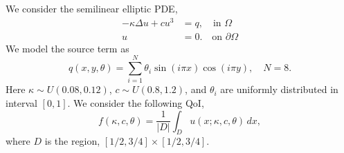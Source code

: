 We consider the semilinear elliptic PDE,
\begin{equation}\label{equ:semilinear}
\begin{aligned}
-\kappa \Delta u + c u^3 &= q, \quad \text{in } \Omega\\
 u &= 0. \quad \text{on } \partial \Omega
\end{aligned}
\end{equation}
We model the source term as 
\begin{equation}
q(x, y, \theta) = \sum_{i = 1}^N \theta_i \sin(i \pi x)
\cos(i \pi y),
\quad N = 8.
\end{equation}
Here $\kappa \sim U(0.08, 0.12)$, $c \sim U(0.8, 1.2)$, 
and $\theta_i$ are uniformly distributed in interval $[0, 1]$. We consider
the following QoI,
\[
     f(\kappa, c, \theta) = \frac{1}{|D|} \int_D u(x; \kappa, c, \theta) \, dx, 
\]
where $D$ is the region, $[1/2, 3/4] \times [1/2, 3/4]$.

































